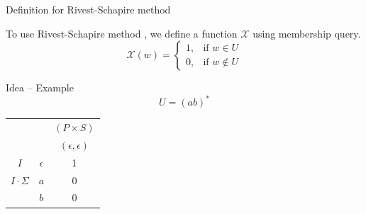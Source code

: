 \documentclass{beamer}
\begin{document}
\begin{frame}{Definition for Rivest-Schapire method}

To use Rivest-Schapire method \cite{rivest1993inference}, we define a function $\mathcal{X}$ using membership query. 
    \[
    \mathcal{X}(w) = \begin{cases} 
        1, & \text{if } w \in U \\ 
        0, & \text{if } w \notin U 
    \end{cases}
    \]
\end{frame}


\begin{frame}{Idea -- Example}
$$
U = (ab)^* 
$$ 


\begin{center}
    \begin{tabular}{|cc|c|}
        \multicolumn{2}{c|}{} & $(P\times S)$ \\
        \multicolumn{2}{c|}{} & $(\epsilon,\epsilon)$ \\ \hline
        $I$ & $\epsilon$ & 1 \\ \hline
        $I \cdot \Sigma$ & $a$ & 0 \\
        & $b$ & 0 \\ \hline
    \end{tabular}
\end{center}
\end{frame}

\end{document}
